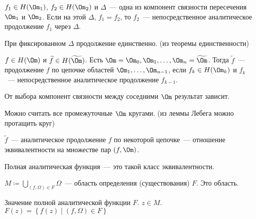 \begin{definition}
    $f_1 \in H(\Om_1)$,
    $f_2 \in H(\Om_2)$ и
    $\Delta$~--- одна из компонент связности
    пересечения $\Om_1$ и $\Om_2$.
    Если на этой $\Delta$, $f_1 = f_2$,
    то $f_2$~--- непосредственное аналитическое продолжение
    $f_1$ через $\Delta$.
\end{definition}

\begin{observation}
    При фиксированном $\Delta$ продолжение единственно.
    (из теоремы единственности)
\end{observation}

\begin{definition}
    $f \in H(\Om)$ и $\widetilde f \in H(\widetilde\Om)$.
    Есть $\Om = \Om_0, \Om_1, \ldots, \Om_n = \widetilde\Om$.
    Тогда $\widetilde{f}$~--- продолжение $f$
    по цепочке областей $\Om_1, \ldots, \Om_{n-1}$,
    если $f_k \in H(\Om_k)$ и
    $f_k$~--- непосредственное аналитическое
    продолжение $f_{k-1}$.
\end{definition}

\begin{observation}
    От выбора компонент связности
    между соседними $\Om$ результат зависит.
\end{observation}

\begin{observation}
    Можно считать все промежуточные
    $\Om$ кругами.
    (из леммы Лебега можно протащить круг)
\end{observation}

\begin{observation}
    $\widetilde f$~--- аналитическое продолжение
    $f$ по некоторой цепочке~--- отношение эквивалентности
    на множестве пар
    $(f, \Om)$.
\end{observation}

\begin{definition}
    Полная аналитическая функция~--- это такой
    класс эквивалентности.

    $M \coloneqq \bigcup\limits_{(f, \Omega) \in F} \Omega$~---
    область определения (существования) $F$.
    Это область.
\end{definition}

\begin{definition}
    Значение полной аналитической функции
    $F$. $z\in M$.
    $F(z) = \left\{f(z) \mid (f, \Omega) \in F\right\}$
\end{definition}

